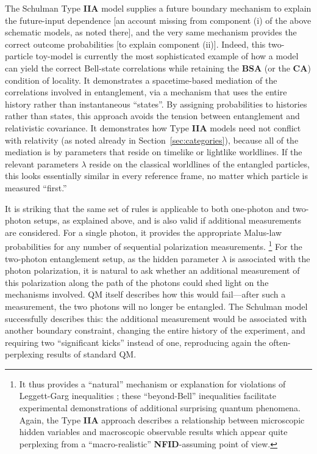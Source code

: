 \documentclass[rmp, aps, preprint, longbibliography]{revtex4-1}
\begin{document}
The Schulman Type {\bf IIA} model supplies a future boundary mechanism to explain the future-input dependence [an account missing from component (i) of the above schematic models, as noted there], and the very same mechanism provides the correct outcome probabilities [to explain component (ii)].  Indeed, this two-particle toy-model is currently the most sophisticated example of how a model can yield the correct Bell-state correlations while retaining the {\bf BSA} (or the {\bf CA}) condition of locality. It demonstrates a spacetime-based mediation of the correlations involved in entanglement, via a mechanism that uses the entire history rather than instantaneous ``states''.  By assigning probabilities to histories rather than states, this approach avoids the tension between entanglement and relativistic covariance.  It demonstrates how Type {\bf IIA} models need not conflict with relativity (as noted already in Section~\ref{sec:categories}), because all of the mediation is by parameters that reside on timelike or lightlike worldlines. If the relevant parameters $\lambda$ reside on the classical worldlines of the entangled particles, this looks essentially similar in every reference frame, no matter which particle is measured ``first.''

It is striking that the same set of rules is applicable to both one-photon and two-photon setups, as explained above, and is also valid if additional measurements are considered.  For a single photon, it provides the appropriate Malus-law probabilities for any number of sequential polarization measurements.%
\footnote{It thus provides a ``natural'' mechanism or explanation for violations of Leggett-Garg inequalities \cite{leggett1985}; these ``beyond-Bell'' inequalities facilitate experimental demonstrations of additional surprising quantum phenomena.  Again, the Type {\bf IIA} approach describes a relationship between microscopic hidden variables and macroscopic observable results which appear quite perplexing from a ``macro-realistic'' {\bf NFID}-assuming point of view.}
For the two-photon entanglement setup, as the hidden parameter $\lambda$ is associated with the photon polarization, it is natural to ask whether an additional measurement of this polarization along the path of the photons could shed light on the mechanisms involved.  QM itself describes how this would fail---after such a measurement, the two photons will no longer be entangled.  The Schulman model successfully describes this: the additional measurement would be associated with another boundary constraint, changing the entire history of the experiment, and requiring two ``significant kicks'' instead of one, reproducing again the often-perplexing results of standard QM\@.
\end{document}
